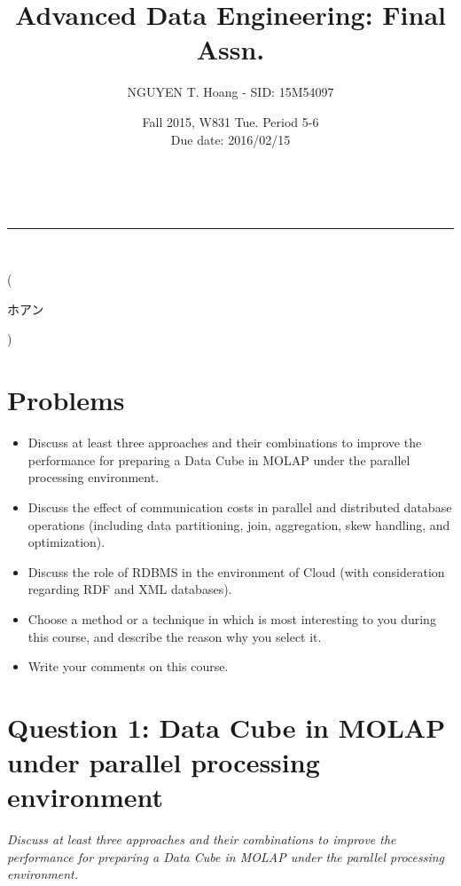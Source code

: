 \documentclass[a4paper,12pt]{article}
\makeatletter
\newcommand{\linia}{\rule{\linewidth}{0.5pt}}
\renewcommand{\maketitle} {
\begin{center}
\vspace{2ex}
{\LARGE \textsc{\@title}}
\vspace{1ex}
\\
\linia\\
\@author \hfill \@date
\vspace{4ex}
\end{center}
}
\makeatother
\begin{document}
\title{Advanced Data Engineering: Final Assn.}

\author{NGUYEN T. Hoang - SID: 15M54097}

\date{Fall 2015, W831 Tue. Period 5-6 \\ \hfill Due date: 2016/02/15}

\maketitle
\vspace{-4.5em}
\hspace{5.3em} (\begin{CJK}{UTF8}{min}ホアン\end{CJK})
\vspace{12em}
\section*{Problems}
\begin{itemize}
	\setlength{\parskip}{0cm}
	\setlength{\itemsep}{0cm}
	\item Discuss at least three approaches and their combinations to improve the performance for preparing a Data Cube in MOLAP under the parallel processing environment.
	\item Discuss the effect of communication costs in parallel and distributed database operations (including data partitioning, join, aggregation, skew handling, and optimization).
	\item Discuss the role of RDBMS in the environment of Cloud (with consideration regarding RDF and XML databases).
	\item Choose a method or a technique in which is most interesting to you during this course, and describe the reason why you select it.
	\item Write your comments on this course.
\end{itemize}

\pagebreak




\section*{Question 1: Data Cube in MOLAP under parallel processing environment} 
\setcounter{section}{1}

\textit{Discuss at least three approaches and their combinations to improve the performance for preparing a Data Cube in MOLAP under the parallel processing environment.} 
\end{document}
